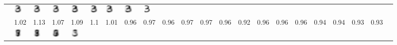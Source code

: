 \documentclass[a4paper,english]{article}
\begin{document}
\begin{table}[]
\begin{tabular}{llllllllllllllllllllll}
 &  \includegraphics[height=0.4cm]{fraction_usps/three_linearPCA_14.png} 
 &  \includegraphics[height=0.4cm]{fraction_usps/three_linearPCA_15.png} 
 &  \includegraphics[height=0.4cm]{fraction_usps/three_linearPCA_16.png} 
 &  \includegraphics[height=0.4cm]{fraction_usps/three_linearPCA_17.png} 
 &  \includegraphics[height=0.4cm]{fraction_usps/three_linearPCA_18.png} 
 &  \includegraphics[height=0.4cm]{fraction_usps/three_linearPCA_19.png}
 &  \includegraphics[height=0.4cm]{fraction_usps/three_linearPCA_20.png}
 &  \includegraphics[height=0.4cm]{fraction_usps/three_clean.png} 
 \\
&  \tiny{1.02}
 &  \tiny{1.13}
 &  \tiny{1.07}
 &  \tiny{1.09}
 &  \tiny{1.1}
 &  \tiny{1.01}
 &  \tiny{0.96}
 &  \tiny{0.97}
 &  \tiny{0.96}
 &  \tiny{0.97}
 &  \tiny{0.97}
 &  \tiny{0.96}
 &  \tiny{0.92}
 &  \tiny{0.96}
 &  \tiny{0.96}
 &  \tiny{0.96}
 &  \tiny{0.94}
 &  \tiny{0.94}
 &  \tiny{0.93}
 &  \tiny{0.93}
 \\ 
 &  \includegraphics[height=0.4cm]{fraction_usps/three_kernelPCA_1.png} 
 &  \includegraphics[height=0.4cm]{fraction_usps/three_kernelPCA_2.png} 
 &  \includegraphics[height=0.4cm]{fraction_usps/three_kernelPCA_3.png} 
 &  \includegraphics[height=0.4cm]{fraction_usps/three_kernelPCA_4.png} 

\end{tabular}
\end{table}
\end{document}
